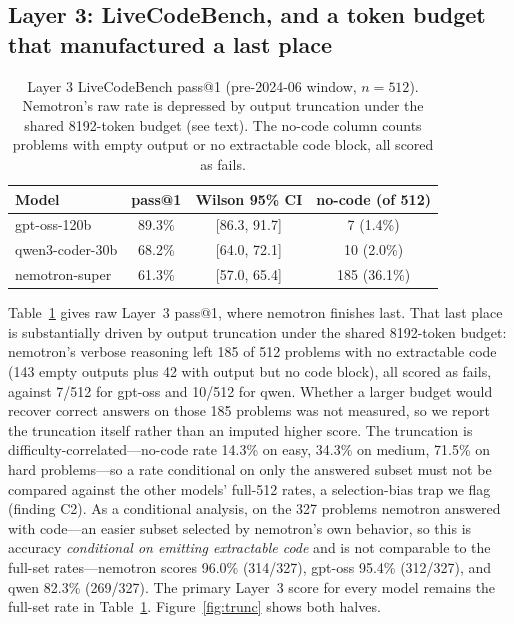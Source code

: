 \documentclass[10pt,twocolumn]{article}
\begin{document}
\subsection{Layer 3: LiveCodeBench, and a token budget that manufactured a last place}
\label{sec:l3}

\begin{table}[t]
\centering
\caption{Layer 3 LiveCodeBench pass@1 (pre-2024-06 window, $n{=}512$). Nemotron's raw rate is
depressed by output truncation under the shared 8192-token budget (see text). The no-code column
counts problems with empty output or no extractable code block, all scored as fails.}
\label{tab:l3}
\small
\begin{tabular}{@{}lccc@{}}
\toprule
Model & pass@1 & Wilson 95\% CI & no-code (of 512) \\
\midrule
gpt-oss-120b & 89.3\% & [86.3, 91.7] & 7 (1.4\%) \\
qwen3-coder-30b & 68.2\% & [64.0, 72.1] & 10 (2.0\%) \\
nemotron-super & 61.3\% & [57.0, 65.4] & 185 (36.1\%) \\
\bottomrule
\end{tabular}
\end{table}

Table~\ref{tab:l3} gives raw Layer~3 pass@1, where nemotron finishes last. That last place is
substantially driven by output truncation under the shared 8192-token budget: nemotron's verbose
reasoning left 185 of 512 problems with no extractable code (143 empty outputs plus 42 with
output but no code block), all scored as fails, against 7/512 for gpt-oss and 10/512 for qwen.
Whether a larger budget would recover correct answers on those 185 problems was not measured, so
we report the truncation itself rather than an imputed higher score. The truncation is
difficulty-correlated---no-code rate 14.3\% on easy, 34.3\% on medium, 71.5\% on hard
problems---so a rate conditional on only the answered subset must not be compared against the
other models' full-512 rates, a selection-bias trap we flag (finding C2). As a conditional
analysis, on the 327 problems nemotron answered with code---an easier subset selected by
nemotron's own behavior, so this is accuracy \emph{conditional on emitting extractable code} and
is not comparable to the full-set rates---nemotron scores 96.0\% (314/327), gpt-oss 95.4\%
(312/327), and qwen 82.3\% (269/327). The primary Layer~3 score for every model remains the
full-set rate in Table~\ref{tab:l3}. Figure~\ref{fig:trunc} shows both halves.
\end{document}
